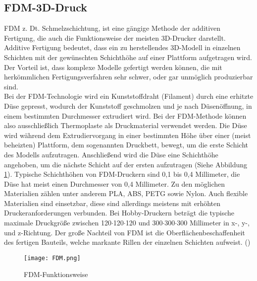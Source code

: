 \subsection{FDM-3D-Druck}
\label{subsec:tFDM}
\ac{FDM} z. Dt. Schmelzschichtung, ist eine gängige Methode der additiven Fertigung, die auch die Funktionsweise der meisten \ac{3D}-Drucker darstellt. Additive Fertigung bedeutet, dass ein zu herstellendes \ac{3D}-Modell in einzelnen Schichten mit der gewünschten Schichthöhe auf einer Plattform aufgetragen wird. Der Vorteil ist, dass komplexe Modelle gefertigt werden können, die mit herkömmlichen Fertigungsverfahren sehr schwer, oder gar unmöglich produzierbar sind.\\
Bei der \ac{FDM}-Technologie wird ein Kunststoffdraht (Filament) durch eine erhitzte Düse gepresst, wodurch der Kunststoff geschmolzen und je nach Düsenöffnung, in einem bestimmten Durchmesser extrudiert wird. Bei der \ac{FDM}-Methode können also ausschließlich Thermoplaste als Druckmaterial verwendet werden. Die Düse wird während dem Extrudiervorgang in einer bestimmten Höhe über einer (meist beheizten) Plattform, dem sogenannten Druckbett, bewegt, um die erste Schicht des Modells aufzutragen. Anschließend wird die Düse eine Schichthöhe angehoben, um die nächste Schicht auf der ersten aufzutragen (Siehe Abbildung \ref{fig:FDM}). Typische Schichthöhen von \ac{FDM}-Druckern sind 0,1 bis 0,4 Millimeter, die Düse hat meist einen Durchmesser von 0,4 Millimeter. Zu den möglichen Materialien zählen unter anderem \ac{PLA}, \ac{ABS}, \ac{PETG} sowie Nylon. Auch flexible Materialien sind einsetzbar, diese sind allerdings meistens mit erhöhten Druckeranforderungen verbunden. Bei Hobby-Druckern beträgt die typische maximale Druckgröße zwischen 120$\cdot$120$\cdot$120 und 300$\cdot$300$\cdot$300 Millimeter in x-, y-, und z-Richtung. Der große Nachteil von \ac{FDM} ist die Oberflächenbeschaffenheit des fertigen Bauteils, welche markante Rillen der einzelnen Schichten aufweist. (\cite{alexandreFDM})
\begin{figure}[h]
\centering
\texttt{[image: FDM.png]}
\caption{FDM-Funktionsweise}
\label{fig:FDM}
\end{figure}

